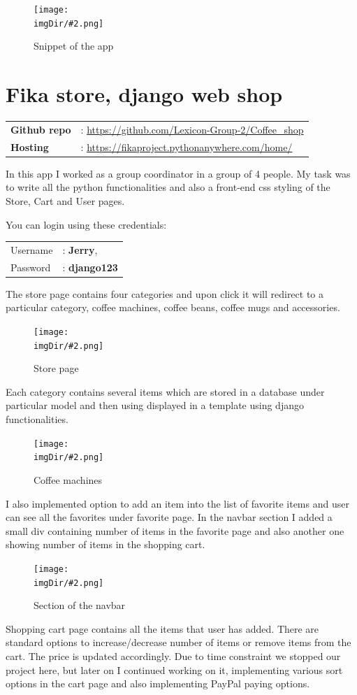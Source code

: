 \documentclass[11pt, onecolumn]{article}
\newcommand{\demo}[2]{%
	\vspace{3mm}
	\begin{tabular}{ll}
		\textbf{Github repo} & : \color{blue}#1\vspace{1mm}\\
		\vspace{2mm}\textbf{Hosting} & : \color{blue}#2 \\
	\end{tabular}
	\vspace{3mm}
}
\newcommand{\fig}[3]{%
	\vspace{-2mm}
	\begin{figure}[H]
		\centering
		\texttt{[image: \\imgDir/\#2.png]}
		\vspace{-3mm}
		\caption[]{#3}
		\label{fig:#2}
	\end{figure}
	\vspace{-2mm}
}
\begin{document}
\fig{120mm}{img-1}{Snippet of the app}



\section{Fika store, django web shop}
\def\imgDir{fika-group2}
\demo{\url{https://github.com/Lexicon-Group-2/Coffee_shop}}{\url{https://fikaproject.pythonanywhere.com/home/}}

\begin{multicols}{2}
In this app I worked as a group coordinator in a group of 4 people. My task was to write all the python functionalities and also a front-end css styling of the Store, Cart and User pages.

\vspace{2mm}
\noindent
You can login using these credentials:

\vspace{1mm}
\noindent
\begin{tabular}{ll}
	Username & : \textbf{Jerry},\\
	Password & : \textbf{django123} \\
\end{tabular}
\vspace{2mm}

The store page contains four categories and upon click it will redirect to a particular category, coffee machines, coffee beans, coffee mugs and accessories.

\fig{80mm}{img-1}{Store page}

Each category contains several items which are stored in a database under particular model and then using displayed in a template using django functionalities.

\fig{80mm}{img-2}{Coffee machines}

I also implemented option to add an item into the list of favorite items and user can see all the favorites under favorite page. In the navbar section I added a small div containing number of items in the favorite page and also another one showing number of items in the shopping cart.

\fig{80mm}{img-3}{Section of the navbar}

Shopping cart page contains all the items that user has added. There are standard options to increase/decrease number of items or remove items from the cart. The price is updated accordingly. Due to time constraint we stopped our project here, but later on I continued working on it, implementing various sort options in the cart page and also implementing PayPal paying options.


\end{multicols}
\end{document}
